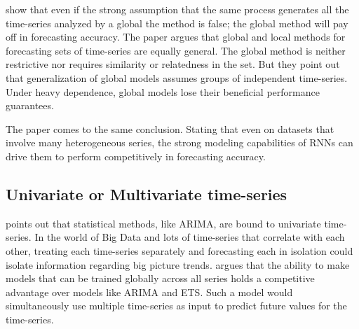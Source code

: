 


\cite{Montero-Manso2021} show that even if the strong assumption that the same process generates all the time-series analyzed by a global
the method is false; the global method will pay off in forecasting accuracy.
The paper argues that global and local methods for forecasting
sets of time-series are equally general. The global method is neither restrictive nor requires
similarity or relatedness in the set.
But they point out that generalization of global models assumes groups of independent time-series.
Under heavy dependence, global models lose their beneficial performance guarantees.

The paper \cite{Hewamalage2021} comes to the same conclusion. Stating that
even on datasets that involve many heterogeneous series, the strong modeling capabilities of RNNs can drive
them to perform competitively in forecasting accuracy.

\subsection{Univariate or Multivariate time-series}
\cite{Bandara2017} points out that statistical methods, like ARIMA, are bound to
univariate time-series. In the world of Big Data and lots of time-series that correlate with each other,
treating each time-series separately and forecasting each in isolation could isolate information regarding big picture trends.
\cite{Bandara2017} argues that the ability to make models that can be trained globally across all series
holds a competitive advantage over models like ARIMA and ETS.
Such a model would simultaneously use multiple time-series as input to predict future values for the time-series.

